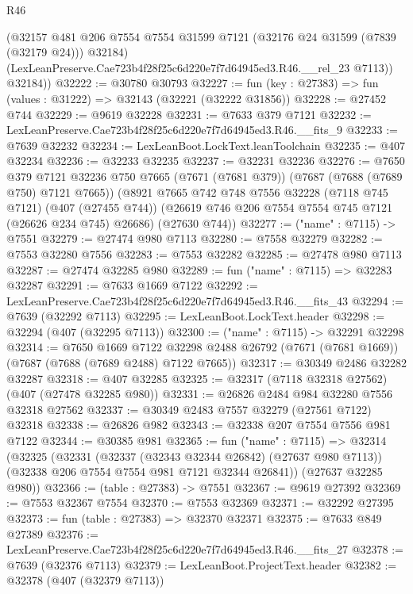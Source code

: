 \begin{lexlean}{R46}
\begin{coremodule}
          (@32157
            @481
            @206
            @7554
            @7554
            @31599
            @7121
            (@32176 @24 @31599 (@7839 (@32179 @24)))
            @32184)
          (LexLeanPreserve.Cae723b4f28f25c6d220e7f7d64945ed3.R46.__rel_23 @7113))
        @32184))
@32222 := @30780 @30793
@32227 := fun (key : @27383) => fun (values : @31222) => @32143 (@32221 (@32222 @31856))
@32228 := @27452 @744
@32229 := @9619 @32228
@32231 := @7633 @379 @7121
@32232 := LexLeanPreserve.Cae723b4f28f25c6d220e7f7d64945ed3.R46.__fits_9
@32233 := @7639 @32232
@32234 := LexLeanBoot.LockText.leanToolchain
@32235 := @407 @32234
@32236 := @32233 @32235
@32237 := @32231 @32236
@32276 := @7650
    @379
    @7121
    @32236
    @750
    @7665
    (@7671 (@7681 @379))
    (@7687 (@7688 (@7689 @750) @7121 @7665))
    (@8921
      @7665
      @742
      @748
      @7556
      @32228
      (@7118 @745 @7121)
      (@407 (@27455 @744))
      (@26619 @746 @206 @7554 @7554 @745 @7121 (@26626 @234 @745) @26686)
      (@27630 @744))
@32277 := ("name" : @7115) -> @7551
@32279 := @27474 @980 @7113
@32280 := @7558 @32279
@32282 := @7553 @32280 @7556
@32283 := @7553 @32282
@32285 := @27478 @980 @7113
@32287 := @27474 @32285 @980
@32289 := fun ("name" : @7115) => @32283 @32287
@32291 := @7633 @1669 @7122
@32292 := LexLeanPreserve.Cae723b4f28f25c6d220e7f7d64945ed3.R46.__fits_43
@32294 := @7639 (@32292 @7113)
@32295 := LexLeanBoot.LockText.header
@32298 := @32294 (@407 (@32295 @7113))
@32300 := ("name" : @7115) -> @32291 @32298
@32314 := @7650
    @1669
    @7122
    @32298
    @2488
    @26792
    (@7671 (@7681 @1669))
    (@7687 (@7688 (@7689 @2488) @7122 @7665))
@32317 := @30349 @2486 @32282 @32287
@32318 := @407 @32285
@32325 := @32317 (@7118 @32318 @27562) (@407 (@27478 @32285 @980))
@32331 := @26826 @2484 @984 @32280 @7556 @32318 @27562
@32337 := @30349 @2483 @7557 @32279 (@27561 @7122) @32318
@32338 := @26826 @982
@32343 := @32338 @207 @7554 @7556 @981 @7122
@32344 := @30385 @981
@32365 := fun ("name" : @7115) =>
  @32314
    (@32325
      (@32331
        (@32337 (@32343 @32344 @26842) (@27637 @980 @7113))
        (@32338 @206 @7554 @7554 @981 @7121 @32344 @26841))
      (@27637 @32285 @980))
@32366 := (table : @27383) -> @7551
@32367 := @9619 @27392
@32369 := @7553 @32367 @7554
@32370 := @7553 @32369
@32371 := @32292 @27395
@32373 := fun (table : @27383) => @32370 @32371
@32375 := @7633 @849 @27389
@32376 := LexLeanPreserve.Cae723b4f28f25c6d220e7f7d64945ed3.R46.__fits_27
@32378 := @7639 (@32376 @7113)
@32379 := LexLeanBoot.ProjectText.header
@32382 := @32378 (@407 (@32379 @7113))

\end{coremodule}
\end{lexlean}
